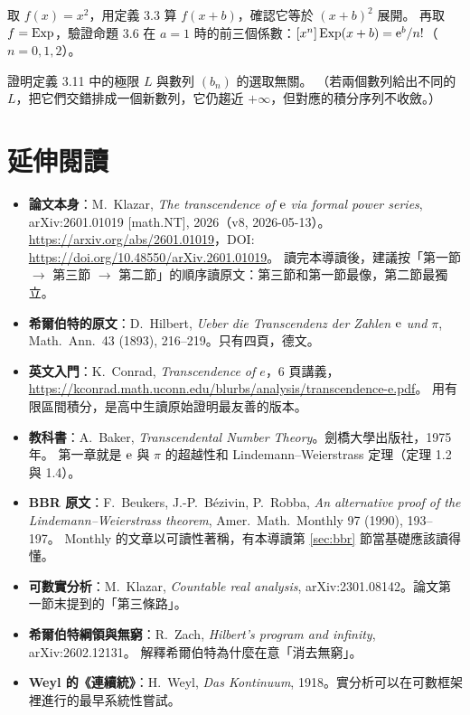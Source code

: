 \begin{exer}
取 $f(x)=x^2$，用定義 3.3 算 $f(x+b)$，確認它等於 $(x+b)^2$ 展開。
再取 $f=\mathrm{Exp}$，驗證命題 3.6 在 $a=1$ 時的前三個係數：$[x^{n}]\,\mathrm{Exp}(x+b)=\mathrm{e}^{b}/n!$（$n=0,1,2$）。
\end{exer}

\begin{exer}[挑戰]
證明定義 3.11 中的極限 $L$ 與數列 $(b_n)$ 的選取無關。
（若兩個數列給出不同的 $L$，把它們交錯排成一個新數列，它仍趨近 $+\infty$，但對應的積分序列不收斂。）
\end{exer}

\section{延伸閱讀}

\begin{itemize}
  \item \textbf{論文本身}：M.~Klazar, \emph{The transcendence of $\mathrm{e}$ via formal power series}, arXiv:2601.01019 [math.NT], 2026（v8, 2026-05-13）。
        \url{https://arxiv.org/abs/2601.01019}，DOI: \url{https://doi.org/10.48550/arXiv.2601.01019}。
        讀完本導讀後，建議按「第一節 $\to$ 第三節 $\to$ 第二節」的順序讀原文：第三節和第一節最像，第二節最獨立。
  \item \textbf{希爾伯特的原文}：D.~Hilbert, \emph{Ueber die Transcendenz der Zahlen $\mathrm{e}$ und $\pi$},
        Math.\ Ann.\ 43 (1893), 216--219。只有四頁，德文。
  \item \textbf{英文入門}：K.~Conrad, \emph{Transcendence of $e$}，6 頁講義，
        \url{https://kconrad.math.uconn.edu/blurbs/analysis/transcendence-e.pdf}。
        用有限區間積分，是高中生讀原始證明最友善的版本。
  \item \textbf{教科書}：A.~Baker, \emph{Transcendental Number Theory}。劍橋大學出版社，1975 年。
        第一章就是 $\mathrm{e}$ 與 $\pi$ 的超越性和 Lindemann--Weierstrass 定理（定理 1.2 與 1.4）。
  \item \textbf{BBR 原文}：F.~Beukers, J.-P.~Bézivin, P.~Robba,
        \emph{An alternative proof of the Lindemann--Weierstrass theorem}, Amer.\ Math.\ Monthly 97 (1990), 193--197。
        Monthly 的文章以可讀性著稱，有本導讀第 \ref{sec:bbr} 節當基礎應該讀得懂。
  \item \textbf{可數實分析}：M.~Klazar, \emph{Countable real analysis}, arXiv:2301.08142。論文第一節末提到的「第三條路」。
  \item \textbf{希爾伯特綱領與無窮}：R.~Zach, \emph{Hilbert's program and infinity}, arXiv:2602.12131。
        解釋希爾伯特為什麼在意「消去無窮」。
  \item \textbf{Weyl 的《連續統》}：H.~Weyl, \emph{Das Kontinuum}, 1918。實分析可以在可數框架裡進行的最早系統性嘗試。
\end{itemize}

